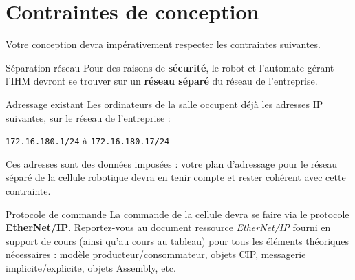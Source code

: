 \section{Contraintes de conception}
\label{secContraintes}

Votre conception devra impérativement respecter les contraintes suivantes.

\begin{UPSTIwarning}{Séparation réseau}
Pour des raisons de \textbf{sécurité}, le robot et l'automate gérant l'IHM
devront se trouver sur un \textbf{réseau séparé} du réseau de l'entreprise.
\end{UPSTIwarning}

\begin{UPSTIinfor}{Adressage existant}
Les ordinateurs de la salle occupent déjà les adresses IP suivantes, sur le
réseau de l'entreprise :
\begin{center}
    \texttt{172.16.180.1/24} à \texttt{172.16.180.17/24}
\end{center}
Ces adresses sont des données imposées : votre plan d'adressage pour le
réseau séparé de la cellule robotique devra en tenir compte et rester
cohérent avec cette contrainte.
\end{UPSTIinfor}

\begin{UPSTIinfor}{Protocole de commande}
La commande de la cellule devra se faire via le protocole
\textbf{EtherNet/IP}. Reportez-vous au document ressource \emph{EtherNet/IP}
fourni en support de cours (ainsi qu'au cours au tableau) pour tous les
éléments théoriques nécessaires : modèle producteur/consommateur, objets CIP,
messagerie implicite/explicite, objets Assembly, etc.
\end{UPSTIinfor}
